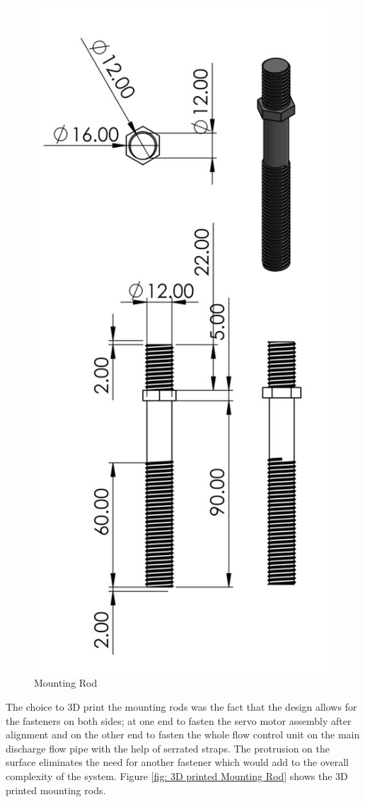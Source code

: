\begin{itemize}
\begin{figure}[H]
        \includegraphics [width=.5\textwidth] {Figures/ServoMotorMountRods.jpg}
        \caption{Mounting Rod}
        \label{fig: Mounting Rod}
        \end{figure}
The choice to 3D print the mounting rods was the fact that the design allows for the fasteners on both sides; at one end to fasten the servo motor assembly after alignment and on the other end to fasten the whole flow control unit on the main discharge flow pipe with the help of serrated straps. The protrusion on the surface eliminates the need for another fastener which would add to the overall complexity of the system. Figure \ref{fig: 3D printed Mounting Rod} shows the 3D printed mounting rods. 
\begin{figure}[H]
        \centering

\end{figure}
\end{itemize}
